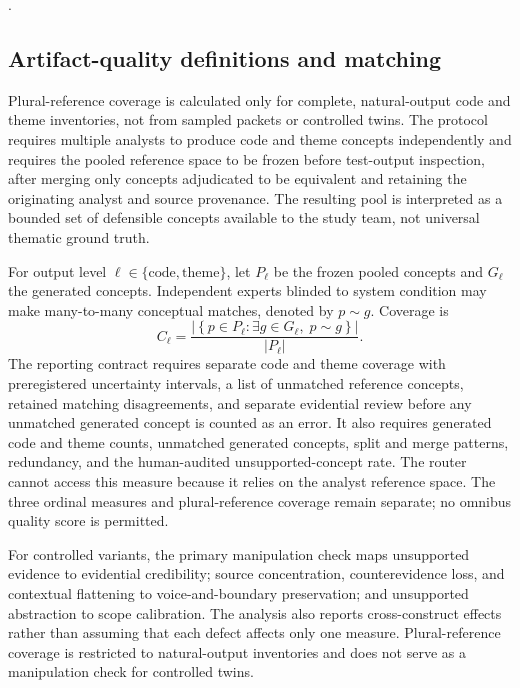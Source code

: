 .

\subsection{Artifact-quality definitions and matching}
\label{sec:artifact_metrics}

Plural-reference coverage is calculated only for complete, natural-output code and theme inventories, not from sampled packets or controlled twins. The protocol requires multiple analysts to produce code and theme concepts independently and requires the pooled reference space to be frozen before test-output inspection, after merging only concepts adjudicated to be equivalent and retaining the originating analyst and source provenance. The resulting pool is interpreted as a bounded set of defensible concepts available to the study team, not universal thematic ground truth.

For output level $\ell\in\{\text{code},\text{theme}\}$, let $P_\ell$ be the frozen pooled concepts and $G_\ell$ the generated concepts. Independent experts blinded to system condition may make many-to-many conceptual matches, denoted by $p\sim g$. Coverage is
\begin{equation}
C_\ell =
\frac{\left|\left\{p\in P_\ell:\exists g\in G_\ell,\;p\sim g\right\}\right|}
     {|P_\ell|}.
\end{equation}
The reporting contract requires separate code and theme coverage with preregistered uncertainty intervals, a list of unmatched reference concepts, retained matching disagreements, and separate evidential review before any unmatched generated concept is counted as an error. It also requires generated code and theme counts, unmatched generated concepts, split and merge patterns, redundancy, and the human-audited unsupported-concept rate. The router cannot access this measure because it relies on the analyst reference space. The three ordinal measures and plural-reference coverage remain separate; no omnibus quality score is permitted.

For controlled variants, the primary manipulation check maps unsupported evidence to evidential credibility; source concentration, counterevidence loss, and contextual flattening to voice-and-boundary preservation; and unsupported abstraction to scope calibration. The analysis also reports cross-construct effects rather than assuming that each defect affects only one measure. Plural-reference coverage is restricted to natural-output inventories and does not serve as a manipulation check for controlled twins.

